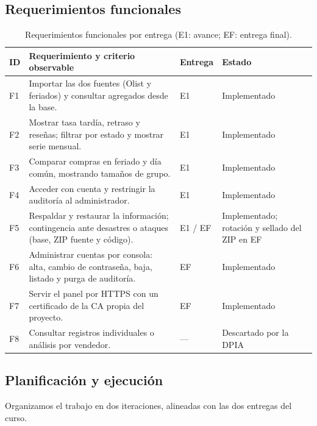 \documentclass[12pt,a4paper]{article}
\begin{document}
\subsection{Requerimientos funcionales}
\begin{table}[H]
\centering\small
\begin{tabularx}{\textwidth}{P{1.0cm}Y P{1.3cm}P{2.6cm}}
\toprule
ID & Requerimiento y criterio observable & Entrega & Estado\\
\midrule
F1 & Importar las dos fuentes (Olist y feriados) y consultar agregados desde la base. & E1 & Implementado\\
F2 & Mostrar tasa tardía, retraso y reseñas; filtrar por estado y mostrar serie mensual. & E1 & Implementado\\
F3 & Comparar compras en feriado y día común, mostrando tamaños de grupo. & E1 & Implementado\\
F4 & Acceder con cuenta y restringir la auditoría al administrador. & E1 & Implementado\\
F5 & Respaldar y restaurar la información; contingencia ante desastres o ataques (base, ZIP fuente y código). & E1 / EF & Implementado; rotación y sellado del ZIP en EF\\
F6 & Administrar cuentas por consola: alta, cambio de contraseña, baja, listado y purga de auditoría. & EF & Implementado\\
F7 & Servir el panel por HTTPS con un certificado de la CA propia del proyecto. & EF & Implementado\\
F8 & Consultar registros individuales o análisis por vendedor. & --- & Descartado por la DPIA\\
\bottomrule
\end{tabularx}
\caption{Requerimientos funcionales por entrega (E1: avance; EF: entrega final).}
\end{table}

\subsection{Planificación y ejecución}
\label{sec:planificacion}
Organizamos el trabajo en dos iteraciones, alineadas con las dos entregas del curso.
\end{document}
